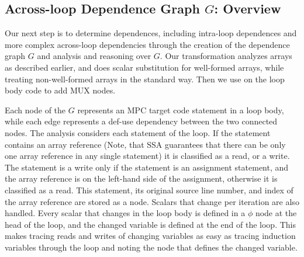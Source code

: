 \subsection{Across-loop Dependence Graph $G$: Overview}
\label{sec:depgraph}

Our next step is to determine dependences, including intra-loop dependences and more complex 
across-loop dependencies through the creation of the dependence graph $G$ and analysis and 
reasoning over $G$. Our transformation analyzes arrays as described earlier, and does scalar substitution
for well-formed arrays, while treating non-well-formed arrays in the standard way. Then we use 
on the loop body code to add MUX nodes. 

Each node of the $G$ represents an MPC target code statement in a loop body, while each edge
represents a def-use dependency between the two connected nodes. The analysis considers
each statement of the loop. If the statement contains an array reference (Note, 
that SSA guarantees that there can be only one array reference in any single
statement) it is classified as a read, or a write. The statement is a write only
if the statement is an assignment statement, and the array reference is on
the left-hand side of the assignment, otherwise it is classified as a read.
This statement, its original source line number, and index of the array
reference are stored as a node. Scalars that change per iteration are also
handled. Every scalar that changes in the loop body is defined in a $\phi$
node at the head of the loop, and the changed variable is defined
at the end of the loop. This makes tracing reads and writes of 
changing variables as easy as tracing induction variables through the loop
and noting the node that defines the changed variable.


